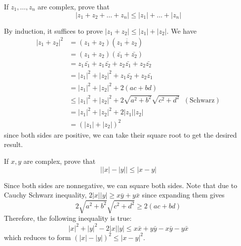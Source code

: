   \begin{exercise}[Rudin 1.12]
    If $z_1, \ldots, z_n$ are complex, prove that
    \begin{equation}
      |z_1 + z_2 + \ldots + z_n| \leq |z_1| + \ldots + |z_n|
    \end{equation}
  \end{exercise}
  \begin{solution}
    By induction, it suffices to prove $|z_1 + z_2| \leq |z_1| + |z_2|$. We have 
    \begin{align*}
      |z_1 + z_2|^2 & = (z_1 + z_2) (\overline{z_1 + z_2}) \\
      & = (z_1 + z_2) (\bar{z_1} + \bar{z_2}) \\ 
      & = z_1 \bar{z_1} + z_1 \bar{z_2} + z_2 \bar{z_1} + z_2 \bar{z_2} \\
      & = |z_1|^2 + |z_2|^2 + z_1 \bar{z_2} + z_2 \bar{z_1} \\
      & = |z_1|^2 + |z_2|^2 + 2 (a c + bd) \\
      & \leq |z_1|^2 + |z_2|^2 + 2 \sqrt{a^2 + b^2} \sqrt{c^2 + d^2} \;\; (\text{Schwarz}) \\
      & = |z_1|^2 + |z_2|^2 + 2 |z_1| |z_2| \\
      & = (|z_1| + |z_2|)^2
    \end{align*}
    since both sides are positive, we can take their square root to get the desired result. 
  \end{solution}

  \begin{exercise}[Rudin 1.13]
    If $x, y$ are complex, prove that 
    \begin{equation}
      \big| |x| - |y| \big| \leq |x - y|
    \end{equation}
  \end{exercise}
  \begin{solution}
    Since both sides are nonnegative, we can square both sides. Note that due to Cauchy Schwarz inequality, $2|x| |y| \geq x \bar{y} + y \bar{x}$ since expanding them gives 
    \begin{equation}
      2 \sqrt{a^2 + b^2} \sqrt{c^2 + d^2} \geq 2 (ac + bd)
    \end{equation}
    Therefore, the following inequality is true: 
    \begin{equation}
      |x|^2 + |y|^2 - 2 |x| |y| \leq x \bar{x} + y \bar{y} - x \bar{y} - y \bar{x}
    \end{equation}
    which reduces to form $(|x| - |y|)^2 \leq |x - y|^2$. 
  \end{solution}


